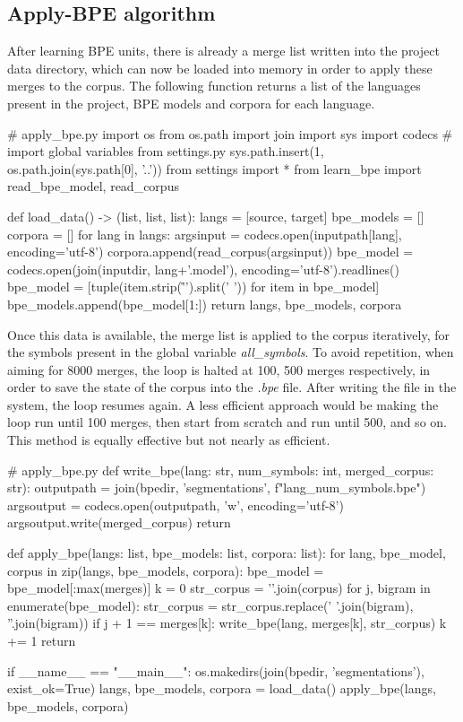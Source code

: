 \subsection{Apply-BPE algorithm}\label{dev:applybpe}

After learning BPE units, there is already a merge list written into the project data directory, which can now be loaded into memory in order to apply these merges to the corpus. The following function returns a list of the languages present in the project, BPE models and corpora for each language.

\begin{python}
# apply_bpe.py
import os
from os.path import join
import sys
import codecs
# import global variables from settings.py
sys.path.insert(1, os.path.join(sys.path[0], '..'))
from settings import *
from learn_bpe import read_bpe_model, read_corpus

def load_data() -> (list, list, list):
  langs = [source, target]
  bpe_models = []
  corpora = []
  for lang in langs:
    argsinput = codecs.open(inputpath[lang], encoding='utf-8')
    corpora.append(read_corpus(argsinput))
    bpe_model = codecs.open(join(inputdir, lang+'.model'), encoding='utf-8').readlines()
    bpe_model = [tuple(item.strip('\r\n ').split(' ')) for item in bpe_model]
    bpe_models.append(bpe_model[1:])
  return langs, bpe_models, corpora
\end{python}

Once this data is available, the merge list is applied to the corpus iteratively, for the symbols present in the global variable \emph{all\_symbols}. To avoid repetition, when aiming for 8000 merges, the loop is halted at 100, 500 merges respectively, in order to save the state of the corpus into the \emph{.bpe} file. After writing the file in the system, the loop resumes again. A less efficient approach would be making the loop run until 100 merges, then start from scratch and run until 500, and so on. This method is equally effective but not nearly as efficient.

\begin{python}
# apply_bpe.py
def write_bpe(lang: str, num_symbols: int, merged_corpus: str):
  outputpath = join(bpedir, 'segmentations', f"{lang}_{num_symbols}.bpe")
  argsoutput = codecs.open(outputpath, 'w', encoding='utf-8')
  argsoutput.write(merged_corpus)
  return

def apply_bpe(langs: list, bpe_models: list, corpora: list):
  for lang, bpe_model, corpus in zip(langs, bpe_models, corpora):
    bpe_model = bpe_model[:max(merges)]
    k = 0
    str_corpus = '\n'.join(corpus)
    for j, bigram in enumerate(bpe_model):
      str_corpus = str_corpus.replace(' '.join(bigram), ''.join(bigram))
      if j + 1 == merges[k]:
        write_bpe(lang, merges[k], str_corpus)
        k += 1
  return

if __name__ == "__main__":
  os.makedirs(join(bpedir, 'segmentations'), exist_ok=True)
  langs, bpe_models, corpora = load_data()
  apply_bpe(langs, bpe_models, corpora)
\end{python}

